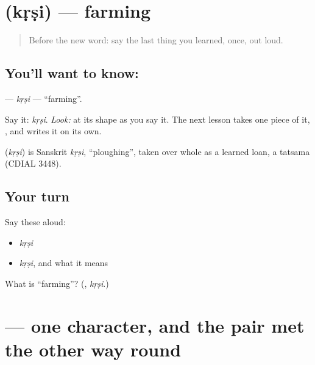 \section[\texorpdfstring{\kn{ಕೃಷಿ} (kṛṣi)}{ಕೃಷಿ (kṛṣi)}]{ (kṛṣi) — farming}

\label{lesson:KA-C31-krushi}



\begin{quote}
Before the new word: say the last thing you learned, once, out loud.
\end{quote}

\subsection*{You'll want to know: }
\textbf{} — \emph{kṛṣi} — \textquotedblleft{}farming\textquotedblright{}.

Say it: \emph{kṛṣi}. \emph{Look:} at its shape as you say it. The next lesson takes one piece of it, \textbf{}, and writes it on its own.

\begin{cousinweb}
\textbf{} (\emph{kṛṣi}) is Sanskrit \emph{kṛṣi}, \textquotedblleft{}ploughing\textquotedblright{}, taken over whole as a learned loan, a tatsama (CDIAL 3448).
\end{cousinweb}

\subsection*{Your turn}
Say these aloud:

\begin{itemize}
\raggedright
  \item \emph{kṛṣi}
  \item \emph{kṛṣi}, and what it means
\end{itemize}

\begin{tcolorbox}[breakable,colback=teal!4,colframe=teal!35!black,title={Before you move on}]
What is \textquotedblleft{}farming\textquotedblright{}? (\textbf{}, \emph{kṛṣi}.)
\end{tcolorbox}
\section[\texorpdfstring{\kn{ೃ} (vowel sign ṛ)}{ೃ (vowel sign ṛ)}]{ — one character, and the pair met the other way round}

